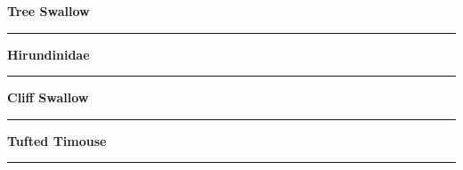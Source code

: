 \documentclass[11pt]{exam}
\newcommand*\Matching[1]{
\ifprintanswers
	\textbf{#1}
\else
	\rule{2.5in}{0.4pt}
\fi
}
\newlength\matchlena
\newlength\matchlenb
\newcommand\MatchQuestion[2]{%
	\setlength\matchlenb{\linewidth}
	\addtolength\matchlenb{-\matchlena}
	\parbox[t]{\matchlena}{\Matching{#1}}\enspace\parbox[t]{\matchlenb}{#2}}
\begin{document}
\begin{questions}
\begin{multicols}{2}
\question\MatchQuestion{Tree Swallow}{}
\vspace{2\baselineskip}
%
\question[\textsc{ec}]\MatchQuestion{Hirundinidae}{}
\vspace{2\baselineskip}
%
%
\question[\textsc{ec}]\MatchQuestion{Cliff Swallow}{}
\vspace{2\baselineskip}
\question[\textsc{ec}]\MatchQuestion{Tufted Timouse}{}
%
%
%
%
%
%
%
%
%
%
%
%
%
%
%
%
%
%
%
%
%
%
%
%
%
%

\end{multicols}

\end{questions}
\end{document}
